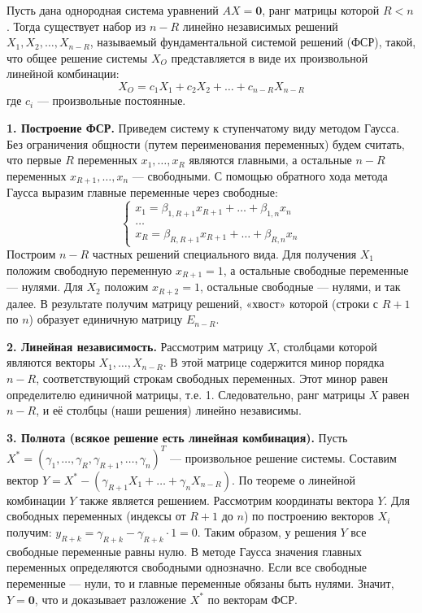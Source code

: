 \begin{theorem}
Пусть дана однородная система уравнений $AX = \mathbf{0}$, ранг матрицы которой $R < n$. Тогда существует набор из $n-R$ линейно независимых решений $X_1, X_2, \dots, X_{n-R}$, называемый фундаментальной системой решений (ФСР), такой, что общее решение системы $X_O$ представляется в виде их произвольной линейной комбинации:
\[ X_O = c_1 X_1 + c_2 X_2 + \dots + c_{n-R} X_{n-R} \]
где $c_i$ — произвольные постоянные.
\end{theorem}

\begin{tcolorbox}[title=Доказательство, breakable]
\textbf{1. Построение ФСР.}
Приведем систему к ступенчатому виду методом Гаусса. Без ограничения общности (путем переименования переменных) будем считать, что первые $R$ переменных $x_1, \dots, x_R$ являются главными, а остальные $n-R$ переменных $x_{R+1}, \dots, x_n$ — свободными. С помощью обратного хода метода Гаусса выразим главные переменные через свободные:
\[
\begin{cases}
x_1 = \beta_{1, R+1}x_{R+1} + \dots + \beta_{1, n}x_n \\
\dots \\
x_R = \beta_{R, R+1}x_{R+1} + \dots + \beta_{R, n}x_n
\end{cases}
\]
Построим $n-R$ частных решений специального вида. Для получения $X_1$ положим свободную переменную $x_{R+1} = 1$, а остальные свободные переменные — нулями. Для $X_2$ положим $x_{R+2} = 1$, остальные свободные — нулями, и так далее.
В результате получим матрицу решений, «хвост» которой (строки с $R+1$ по $n$) образует единичную матрицу $E_{n-R}$.

\textbf{2. Линейная независимость.}
Рассмотрим матрицу $X$, столбцами которой являются векторы $X_1, \dots, X_{n-R}$. В этой матрице содержится минор порядка $n-R$, соответствующий строкам свободных переменных. Этот минор равен определителю единичной матрицы, т.е. 1. Следовательно, ранг матрицы $X$ равен $n-R$, и её столбцы (наши решения) линейно независимы.

\textbf{3. Полнота (всякое решение есть линейная комбинация).}
Пусть $X^* = (\gamma_1, \dots, \gamma_R, \gamma_{R+1}, \dots, \gamma_n)^T$ — произвольное решение системы. Составим вектор $Y = X^* - (\gamma_{R+1} X_1 + \dots + \gamma_n X_{n-R})$. По теореме о линейной комбинации $Y$ также является решением.
Рассмотрим координаты вектора $Y$. Для свободных переменных (индексы от $R+1$ до $n$) по построению векторов $X_i$ получим:
$y_{R+k} = \gamma_{R+k} - \gamma_{R+k} \cdot 1 = 0$.
Таким образом, у решения $Y$ все свободные переменные равны нулю. В методе Гаусса значения главных переменных определяются свободными однозначно. Если все свободные переменные — нули, то и главные переменные обязаны быть нулями. Значит, $Y = \mathbf{0}$, что и доказывает разложение $X^*$ по векторам ФСР.
\end{tcolorbox}

